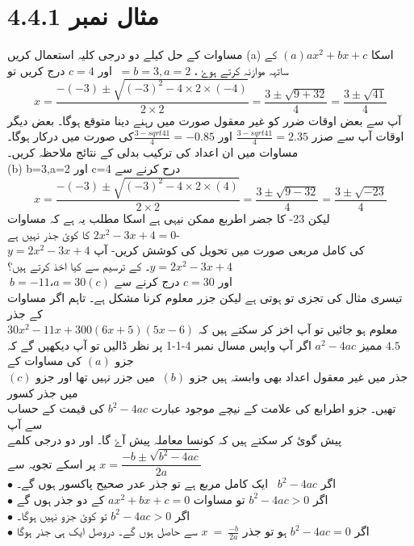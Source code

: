 \section{
مثال نمبر
 4.4.1}
مساوات کے حل کیلے دو درجی کلیہ استعمال کریں
(a)
اسکا  $(a) ax^{2} +bx +c$ کے ساتہہ موازنہ کرتے ہوۓ ، $\ =b=3, a=2 $ اور $ c=4 $ درج کریں 
تو
\[x=\frac{-(-3)\pm\sqrt{(-3)^{2}-4\times2\times(-4)}}{2\times2}=\frac{3\pm\sqrt{9+32}}{4}=\frac{3\pm\sqrt{41}}{4}\]
 آپ سے بعض اوقات ضرر کو غیر معقول صورت میں رہنے دینا متوقع ہوگا۔ بعض دیگر اوقات آپ 
سے صزر $\frac{3-sqrt{41}}{4} = 2.35 $ اور $  \frac{3-sqrt{41}}{4} = -0.85 $کی صورت میں درکار ہوگا۔ مساوات میں ان اعداد کی
ترکیب بدلی کے نتائج ملاحظہ کریں۔\\
(b)
 b=3,a=2 اور c=4
 درح کرنے سے 
\[x=\frac{-(-3)\pm\sqrt{(-3)^{2}-4\times2\times(4)}}{2\times2}=\frac{3\pm\sqrt{9-32}}{4}=\frac{3\pm\sqrt{-23}}{4}\]
لیکن 23- کا جضر اطربع ممکن نیہی ہے اسکا مطلب یہ ہے کہ مساوات  $ 2x^{2}-3x+4=0 $ کا 
کوئ جذر نہیں ہے-\\
 $y=2x^{2}-3x+4$
   کی کامل مربعی صورت میں تحویل کی کوشش کریں- آپ
    $ y=2x^{2} -3x +4$۔
   کے ترسیم سے کیا اخذ کرتے ہیں؟ \\ 
\newpage
$\ b = -11،a=30(c)$ اور $ c=30 $ درج کرنے سے \\
تیسری مثال کی تجزی تو ہوتی ہے لیکن جزر معلوم کرنا مشکل ہے۔ تاہم اگر مساوات کے جذر \\
معلوم ہو جائیں تو آپ اخز کر سکتے ہیں کہ $ 30x^{2} -11x + 300(6x+5)(5x-6)$
$4.5$ ممیز $a^{2} -4ac$
اگر آپ واپس مسال نمبر 4-1-1 پر نظر ڈالیں تو آپ دیکھیں گے کہ جزو $(a)$ کی مساوات کے \\
 جذر میں غیر معقول اعداد بھی وابستہ ہیں جزو $ \ (b) $ میں جزر نہیں تھا اور جزو $(c)$ میں جذر کسور \\
 تھیں۔
 جزو اطرابع کی علامت کے نیچے موجود عبارت $b^{2}-4ac$ کی قیمت کے حساب سے آپ\\
 پیش گوئ کر سکتے ہیں کہ کونسا معاملہ پیش آۓ گا۔ اور دو درجی کلمے $ x= \dfrac{-b \pm \sqrt{b^{2}-4ac}}{2a}$ پر اسکے 
تجویہ سے \\
$\bullet$ اگر $ b^{2}-4ac$ \ ایک کامل مربع ہے تو جذر عدر صحیح پاکسور ہوں گے۔\\
$\bullet$ اگر $ b^{2} - 4ac > 0 $ تو مساوات $ ax^{2} + bx + c = 0 $ کے دو جذر ہوں گے\\
$ \hspace{10pt} $ \\
$\bullet$ اگر $b^{2}-4ac>0$ تو کوئ جزو نہیں ہوگا۔\\
$\bullet$ اگر $b^{2}-4ac=0$ ہو تو جذر $ x\ =\ \frac{-b}{2a} $ سے حاصل ہوں گے۔ دروصل ایک ہی جذر ہوگا\\

